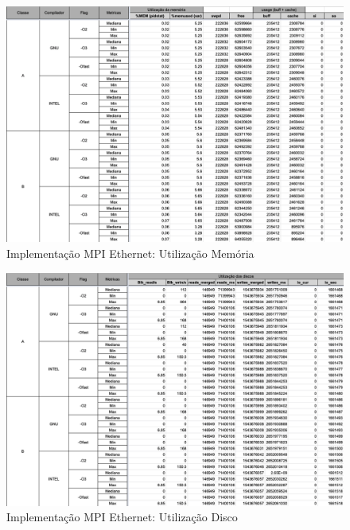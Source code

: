\documentclass{article}
\begin{document}
\begin{appendices}
\begin{figure}[H]
    \centering
    \includegraphics[width=12cm]{Pictures/LUMZ_r641_MPIE_MEM.png}
    \caption{Implementação MPI Ethernet: Utilização Memória}
    \label{figure:LUMZ_r641_MPIE_MEM}
\end{figure}

\begin{figure}[H]
    \centering
    \includegraphics[width=12cm]{Pictures/LUMZ_r641_MPIE_DISK.png}
    \caption{Implementação MPI Ethernet: Utilização Disco}
    \label{figure:LUMZ_r641_MPIE_DISK}
\end{figure}


\end{appendices}
\end{document}
